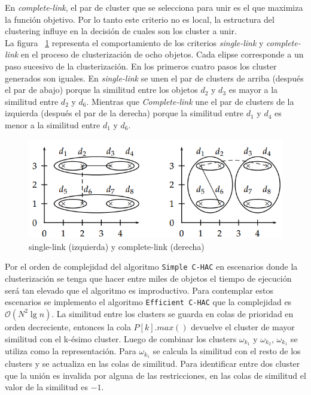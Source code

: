 En \textit{complete-link}, el par de cluster que se selecciona para unir es el que maximiza la función objetivo. Por lo tanto este criterio no es local, la estructura del clustering influye en la decisión de cuales son los cluster a unir.\\

La figura ~\ref{des:LinkageCriteria} representa el comportamiento de los criterios \textit{single-link} y \textit{complete-link} en el proceso de clusterización de ocho objetos. Cada elipse corresponde a un paso sucesivo de la clusterización. En los primeros cuatro pasos los cluster generados son iguales. En \textit{single-link} se unen el par de clusters de arriba (después el par de abajo) porque la similitud entre los objetos $d_2$ y $d_3$ es mayor a la similitud entre $d_2$ y $d_6$. Mientras que \textit{Complete-link} une el par de clusters de la izquierda (después el par de la derecha) porque la similitud entre 
 $d_1$ y $d_4$ es menor a la similitud entre $d_1$ y $d_6$.\\

\begin{figure}[H]
  \centering
    \includegraphics[width=1\textwidth]{img/LinkageCriteria.png}
  \caption{single-link (izquierda) y complete-link (derecha)}
  \label{des:LinkageCriteria}
\end{figure}


Por el orden de complejidad del algoritmo \texttt{Simple C-HAC}  en escenarios donde la clusterización se tenga que hacer entre miles de objetos el tiempo de ejecución será tan elevado que el algoritmo es improductivo. Para contemplar estos escenarios se implemento el algoritmo \texttt{Efficient C-HAC} que la complejidad es $\mathcal{O}(N^{2}\lg n)$. La similitud entre los clusters se guarda en colas de prioridad en orden decreciente, entonces la cola $P\left[k\right].max()$ devuelve el cluster de mayor similitud con el k-ésimo cluster. Luego de combinar los clusters $\omega_{k_{1}}$ y $\omega_{k_{2}}$, $\omega_{k_{1}}$ se utiliza como la representación. Para $\omega_{k_{1}}$ se calcula la similitud con el resto de los clusters y se actualiza en las colas de similitud. Para identificar entre dos cluster que la unión es invalida por alguna de las restricciones, en las colas de similitud el valor de la similitud es $-1$.\\

